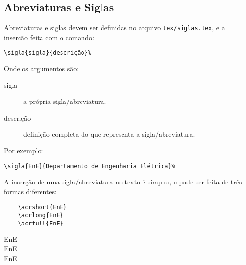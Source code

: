 \subsection{Abreviaturas e Siglas}
Abreviaturas e siglas devem ser definidas no arquivo \texttt{tex/siglas.tex}, e
a inserção feita com o comando:

\begin{verbatim}
\sigla{sigla}{descrição}%
\end{verbatim}

Onde os argumentos são:
\begin{description}
	\item[sigla] a própria sigla/abreviatura.
	\item[descrição] definição completa do que representa a sigla/abreviatura.
\end{description}

Por exemplo:

\begin{verbatim}
\sigla{EnE}{Departamento de Engenharia Elétrica}%
\end{verbatim}

A inserção de uma sigla/abreviatura no texto é simples, e pode ser feita de três
formas diferentes:

\begin{minipage}[t]{.3\textwidth}%
	\begin{verbatim}
	\acrshort{EnE}
	\acrlong{EnE}
	\acrfull{EnE}
	\end{verbatim}
\end{minipage}%
\begin{minipage}[t]{.6\textwidth}%
	\acrshort{EnE}\\
	\acrlong{EnE}\\
	\acrfull{EnE}
\end{minipage}%